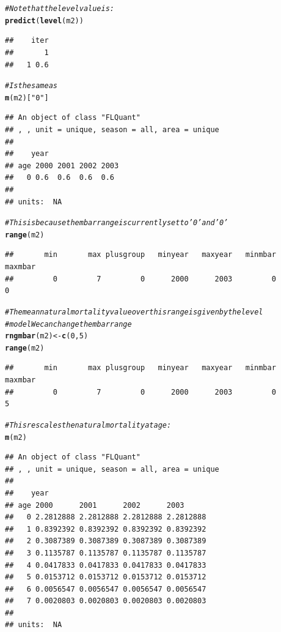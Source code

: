 \documentclass[a4paper,english,10pt]{article}\usepackage[]{graphicx}\usepackage[]{color}
\makeatletter
\newcommand{\hlnum}[1]{\textcolor[rgb]{0.686,0.059,0.569}{#1}}%
\newcommand{\hlstr}[1]{\textcolor[rgb]{0.192,0.494,0.8}{#1}}%
\newcommand{\hlcom}[1]{\textcolor[rgb]{0.678,0.584,0.686}{\textit{#1}}}%
\newcommand{\hlstd}[1]{\textcolor[rgb]{0.345,0.345,0.345}{#1}}%
\newcommand{\hlkwb}[1]{\textcolor[rgb]{0.69,0.353,0.396}{#1}}%
\newcommand{\hlkwd}[1]{\textcolor[rgb]{0.737,0.353,0.396}{\textbf{#1}}}%
\newenvironment{kframe}{%
 \def\at@end@of@kframe{}%
 \ifinner\ifhmode%
  \def\at@end@of@kframe{\end{minipage}}%
  \begin{minipage}{\columnwidth}%
 \fi\fi%
 \def\FrameCommand##1{\hskip\@totalleftmargin \hskip-\fboxsep
 \colorbox{shadecolor}{##1}\hskip-\fboxsep
     \hskip-\linewidth \hskip-\@totalleftmargin \hskip\columnwidth}%
 \MakeFramed {\advance\hsize-\width
   \@totalleftmargin\z@ \linewidth\hsize
   \@setminipage}}%
 {\par\unskip\endMakeFramed%
 \at@end@of@kframe}
\newenvironment{knitrout}{}{} %
\makeatother
\begin{document}
\begin{knitrout}
\begin{kframe}
\begin{alltt}
\hlcom{# Note that the level value is:}
\hlkwd{predict}\hlstd{(}\hlkwd{level}\hlstd{(m2))}
\end{alltt}
\begin{verbatim}
##    iter
##       1
##   1 0.6
\end{verbatim}
\begin{alltt}
\hlcom{# Is the same as}
\hlkwd{m}\hlstd{(m2)[}\hlstr{"0"}\hlstd{]}
\end{alltt}
\begin{verbatim}
## An object of class "FLQuant"
## , , unit = unique, season = all, area = unique
## 
##    year
## age 2000 2001 2002 2003
##   0 0.6  0.6  0.6  0.6 
## 
## units:  NA
\end{verbatim}
\begin{alltt}
\hlcom{# This is because the mbar range is currently set to '0' and '0'}
\hlkwd{range}\hlstd{(m2)}
\end{alltt}
\begin{verbatim}
##       min       max plusgroup   minyear   maxyear   minmbar   maxmbar 
##         0         7         0      2000      2003         0         0
\end{verbatim}
\begin{alltt}
\hlcom{# The mean natural mortality value over this range is given by the level}
\hlcom{# model We can change the mbar range}
\hlkwd{rngmbar}\hlstd{(m2)} \hlkwb{<-} \hlkwd{c}\hlstd{(}\hlnum{0}\hlstd{,} \hlnum{5}\hlstd{)}
\hlkwd{range}\hlstd{(m2)}
\end{alltt}
\begin{verbatim}
##       min       max plusgroup   minyear   maxyear   minmbar   maxmbar 
##         0         7         0      2000      2003         0         5
\end{verbatim}
\begin{alltt}
\hlcom{# This rescales the natural mortality at age:}
\hlkwd{m}\hlstd{(m2)}
\end{alltt}
\begin{verbatim}
## An object of class "FLQuant"
## , , unit = unique, season = all, area = unique
## 
##    year
## age 2000      2001      2002      2003     
##   0 2.2812888 2.2812888 2.2812888 2.2812888
##   1 0.8392392 0.8392392 0.8392392 0.8392392
##   2 0.3087389 0.3087389 0.3087389 0.3087389
##   3 0.1135787 0.1135787 0.1135787 0.1135787
##   4 0.0417833 0.0417833 0.0417833 0.0417833
##   5 0.0153712 0.0153712 0.0153712 0.0153712
##   6 0.0056547 0.0056547 0.0056547 0.0056547
##   7 0.0020803 0.0020803 0.0020803 0.0020803
## 
## units:  NA
\end{verbatim}

\end{kframe}
\end{knitrout}
\end{document}
